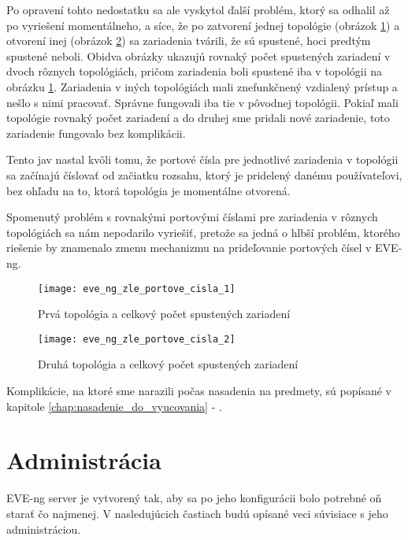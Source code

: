 Po opravení tohto nedostatku sa ale vyskytol ďalší problém, ktorý sa odhalil až po vyriešení momentálneho, a síce, že po zatvorení jednej topológie (obrázok \ref{obr:eve_ng_zle_portove_cisla_1}) a otvorení inej (obrázok \ref{obr:eve_ng_zle_portove_cisla_2}) sa zariadenia tvárili, že sú spustené, hoci predtým spustené neboli. Obidva obrázky ukazujú rovnaký počet spustených zariadení v dvoch rôznych topológiách, pričom zariadenia boli spustené iba v topológii na obrázku \ref{obr:eve_ng_zle_portove_cisla_1}. Zariadenia v iných topológiách mali znefunkčnený vzdialený prístup a nešlo s nimi pracovať. Správne fungovali iba tie v pôvodnej topológii. Pokiaľ mali topológie rovnaký počet zariadení a do druhej sme pridali nové zariadenie, toto zariadenie fungovalo bez komplikácii.

Tento jav nastal kvôli tomu, že portové čísla pre jednotlivé zariadenia v topológii sa začínajú číslovať od začiatku rozsahu, ktorý je pridelený danému používateľovi, bez ohľadu na to, ktorá topológia je momentálne otvorená.

Spomenutý problém s rovnakými portovými číslami pre zariadenia v rôznych topológiách sa nám nepodarilo vyriešiť, pretože sa jedná o hlbší problém, ktorého riešenie by znamenalo zmenu mechanizmu na prideľovanie portových čísel v EVE-ng.

\begin{figure}
    \centering
    \texttt{[image: eve\_ng\_zle\_portove\_cisla\_1]}
    \caption{Prvá topológia a celkový počet spustených zariadení}
    \label{obr:eve_ng_zle_portove_cisla_1}
\end{figure}

\begin{figure}
    \centering
    \texttt{[image: eve\_ng\_zle\_portove\_cisla\_2]}
    \caption{Druhá topológia a celkový počet spustených zariadení}
    \label{obr:eve_ng_zle_portove_cisla_2}
\end{figure}

Komplikácie, na ktoré sme narazili počas nasadenia na predmety, sú popísané v kapitole \ref{chap:nasadenie_do_vyucovania} - .




\section{Administrácia}

EVE-ng server je vytvorený tak, aby sa po jeho konfigurácii bolo potrebné oň starať čo najmenej. V nasledujúcich častiach budú opísané veci súvisiace s jeho administráciou.




